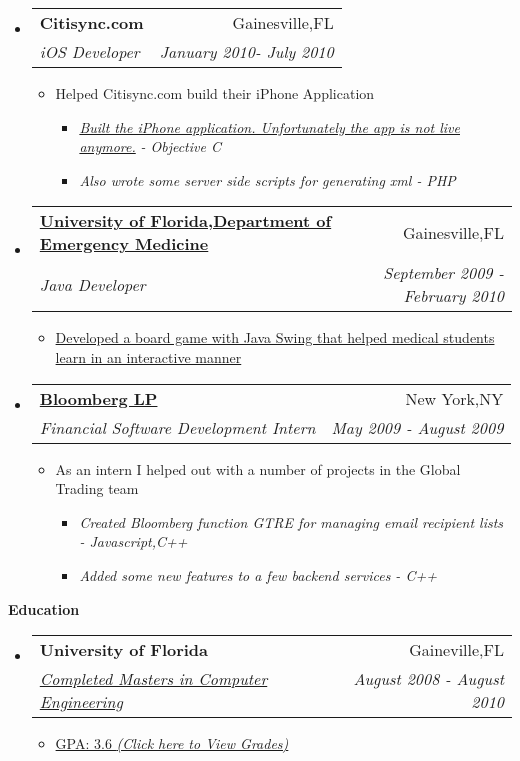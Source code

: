 \documentclass[letterpaper,11pt]{article}
\makeatletter
\newcommand{\resitem}[1]{\item #1 \vspace{-2pt}}
\newcommand{\resheading}[1]{{\large \colorbox{mygrey}{\begin{minipage}{\textwidth}{\textbf{#1 \vphantom{p\^{E}}}}\end{minipage}}}}
\newcommand{\ressubheading}[4]{
\begin{tabular*}{7.0in}{l@{\extracolsep{\fill}}r}
		\textbf{#1} & #2 \\
		\textit{#3} & \textit{#4} \\
\end{tabular*}\vspace{-6pt}}
\makeatother
\begin{document}
\begin{itemize}
\item
    \ressubheading{Citisync.com}{Gainesville,FL}{iOS Developer}{January 2010- July 2010}
    \begin{itemize}
        \resitem{Helped Citisync.com build their iPhone Application}
        \begin{itemize}
            \resitem{\href{http://www.alligator.org/news/campus/article_8fe50876-c78b-11df-96a3-001cc4c03286.html}{\emph{Built the iPhone application. Unfortunately the app is not live anymore.}}\emph{ - Objective C}}
           \resitem{\emph{Also wrote some server side scripts for generating xml - PHP}}
        \end{itemize}
    \end{itemize}

\item
    \ressubheading{\href{http://emergency.med.ufl.edu}{University of Florida,Department of Emergency Medicine}}{Gainesville,FL}{Java Developer}{September 2009 - February 2010}
    \begin{itemize}
        \resitem{\href{http://onlinelibrary.wiley.com/doi/10.1111/j.1553-2712.2009.00392_16.x/abstract}{Developed a board game with Java Swing that helped medical students learn in an interactive manner}}
    \end{itemize}
                
\item
    \ressubheading{\href{http://www.bloomberg.com}{Bloomberg LP}}{New York,NY}{Financial Software Development Intern}{May 2009 - August 2009}
    \begin{itemize}
    	\resitem{As an intern I helped out with a number of projects in the Global Trading team}
        \begin{itemize}
        	   \resitem{\emph{Created Bloomberg function GTRE for managing email recipient lists - Javascript,C++}}
            \resitem{\emph{Added some new features to a few backend services - C++ }}
         \end{itemize}
    \end{itemize}
    
    
\end{itemize}

	
\resheading{Education}
\begin{itemize}
\item
    \ressubheading{University of Florida}{Gaineville,FL}{\href{http://dl.dropbox.com/u/23360122/UF_Grades.pdf}{Completed Masters in Computer Engineering}}{August 2008 - August 2010}
    \begin{itemize}
        \resitem{\href{http://dl.dropbox.com/u/23360122/UF_Grades.pdf}{GPA: 3.6 \emph{(Click here to View Grades)}}}
    \end{itemize}
\end{itemize}
\end{document}
